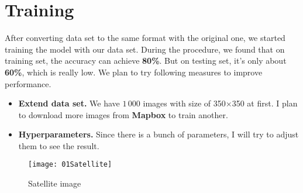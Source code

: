 \documentclass[journal, a4paper]{IEEEtran}
\begin{document}
\section{Training}
	After converting data set to the same format with the original one, we started training the model with our data set. During the procedure, we found that on training set, the accuracy can achieve \textbf{80\%}. But on testing set, it's only about \textbf{60\%}, which is really low. We plan to try following measures to improve performance.
	\begin{itemize}
		\item \textbf{Extend data set.} We have $1\,000$ images with size of 350$\times$350 at first. I plan to download more images from \textbf{Mapbox} to train another.
		\item \textbf{Hyperparameters.} Since there is a bunch of parameters, I will try to adjust them to see the result. 
	\end{itemize}


	



	\begin{figure}[!hbt]
		\begin{center}
		\texttt{[image: 01Satellite]}
		\caption{Satellite image}
		\label{fig:sat}
		\end{center}
	\end{figure}
\end{document}
